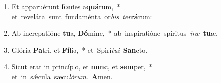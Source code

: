 \begin{flushleft}
\begin{enumerate}[leftmargin=*]
\item Et apparuérunt \textbf{fon}tes a\textbf{quá}rum,~* \mbox{et reveláta sunt fundaménta or{\it bis} {\it ter}\textbf{rá}rum:}
\item Ab increpatióne \textbf{tu}a, \textbf{Dó}mine,~* \mbox{ab inspiratióne spíritus {\it i}{\it ræ} \textbf{tu}æ.}
\item Glória \textbf{Pa}tri, et \textbf{Fí}lio,~* \mbox{et Spirí{\it tu}{\it i} \textbf{San}cto.}
\item Sicut erat in princípio, et \textbf{nunc}, et \textbf{sem}per,~* \mbox{et in s\'{\ae}cula sæcu{\it ló}{\it rum}. \textbf{A}men.}

\end{enumerate}
\end{flushleft}

